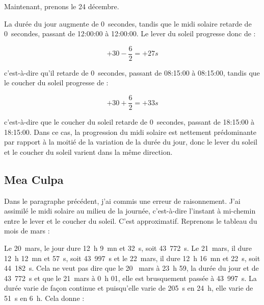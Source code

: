 \documentclass[a4paper]{article}
\newenvironment{texte}{\rmfamily}{}
\newcommand{\veilaubehhmmss}[0]{08:15:00}
\newcommand{\jouraubehhmmss}[0]{08:15:00}
\newcommand{\veilmidihhmmss}[0]{12:00:00}
\newcommand{\jourmidihhmmss}[0]{12:00:00}
\newcommand{\veilsoirhhmmss}[0]{18:15:00}
\newcommand{\joursoirhhmmss}[0]{18:15:00}
\newcommand{\deltalumi}[0]{0}
\newcommand{\deltaaube}[0]{0}
\newcommand{\deltamidi}[0]{0}
\newcommand{\deltasoir}[0]{0}
\begin{document}
\begin{texte}
\vspace{5mm}

Maintenant, prenons le 24 décembre.

\vspace{2mm}
\vspace{2mm}

La durée du jour augmente de \deltalumi~secondes, tandis que le midi
solaire retarde de \deltamidi~secondes, passant de \veilmidihhmmss{} à \jourmidihhmmss.
Le lever du soleil progresse donc de :

\[ +30 - \frac{6}{2} = +27 s \]

c'est-à-dire qu'il retarde de \deltaaube~secondes, passant
de \veilaubehhmmss{} à \jouraubehhmmss, tandis que le
coucher du soleil progresse de :

\[ +30 + \frac{6}{2} = +33 s \]

c'est-à-dire que le coucher du soleil retarde de \deltasoir~secondes,
passant de \veilsoirhhmmss{} à \joursoirhhmmss{}.
Dans ce cas, la progression du midi solaire est nettement
prédominante par rapport à la moitié de la variation de la
durée du jour, donc le lever du soleil et le coucher
du soleil varient dans la même direction.

\vspace{5mm}

\subsection{Mea Culpa}

Dans le paragraphe précédent, j'ai commis une erreur de raisonnement.
J'ai assimilé le midi solaire au milieu de la journée, c'est-à-dire l'instant à mi-chemin entre
le lever et le coucher du soleil. C'est approximatif. Reprenons le
tableau du mois de mars :

\vspace{2mm}
\vspace{2mm}

Le 20~mars, le jour dure 12~h 9~mn et 32~s, soit 43~772~s.
Le 21~mars, il dure 12~h 12~mn et 57~s, soit 43~997~s
et le 22~mars, il dure 12~h 16~mn et 22~s, soit 44~182~s.
Cela ne veut pas dire que le 20~ mars à 23~h 59, la durée
du jour et de 43~772~s et que le 21~mars à 0~h 01, elle est
brusquement passée à 43~997~s. La durée varie de façon continue
et puisqu'elle varie de 205~s en 24~h, elle varie de 51~s en 6~h.
Cela donne :


\end{texte}
\end{document}
